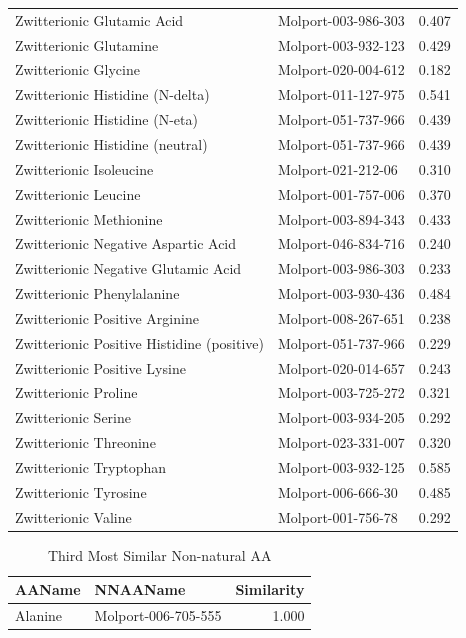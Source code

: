 \documentclass[a4paper,11pt]{article}\usepackage[]{graphicx}\usepackage[]{xcolor}
\begin{document}
\begin{enumerate}
\begin{table}[H]
\begin{tabular}[t]{llr}
Zwitterionic Glutamic Acid & Molport-003-986-303 & 0.407\\
Zwitterionic Glutamine & Molport-003-932-123 & 0.429\\
Zwitterionic Glycine & Molport-020-004-612 & 0.182\\
Zwitterionic Histidine (N-delta) & Molport-011-127-975 & 0.541\\
Zwitterionic Histidine (N-eta) & Molport-051-737-966 & 0.439\\
Zwitterionic Histidine (neutral) & Molport-051-737-966 & 0.439\\
Zwitterionic Isoleucine & Molport-021-212-06 & 0.310\\
Zwitterionic Leucine & Molport-001-757-006 & 0.370\\
Zwitterionic Methionine & Molport-003-894-343 & 0.433\\
Zwitterionic Negative Aspartic Acid & Molport-046-834-716 & 0.240\\
Zwitterionic Negative Glutamic Acid & Molport-003-986-303 & 0.233\\
Zwitterionic Phenylalanine & Molport-003-930-436 & 0.484\\
Zwitterionic Positive Arginine & Molport-008-267-651 & 0.238\\
Zwitterionic Positive Histidine (positive) & Molport-051-737-966 & 0.229\\
Zwitterionic Positive Lysine & Molport-020-014-657 & 0.243\\
Zwitterionic Proline & Molport-003-725-272 & 0.321\\
Zwitterionic Serine & Molport-003-934-205 & 0.292\\
Zwitterionic Threonine & Molport-023-331-007 & 0.320\\
Zwitterionic Tryptophan & Molport-003-932-125 & 0.585\\
Zwitterionic Tyrosine & Molport-006-666-30 & 0.485\\
Zwitterionic Valine & Molport-001-756-78 & 0.292\\
\bottomrule
\end{tabular}
\end{table} \captionsetup{margin = 55pt}
\begin{table}[H] \captionsetup{margin = 55pt}
\centering
\caption{\label{tab:most3}Third Most Similar Non-natural AA}
\centering
\fontsize{10}{12}\selectfont
\begin{tabular}[t]{llr}
\toprule
AAName & NNAAName & Similarity\\
\midrule
Alanine & Molport-006-705-555 & 1.000\\

\end{tabular}
\end{table}
\end{enumerate}
\end{document}
